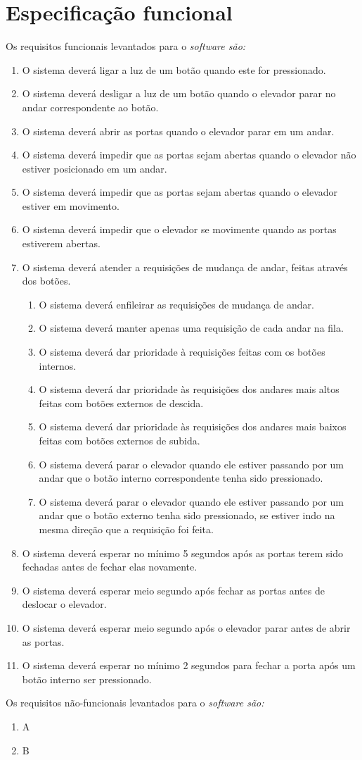 
\section{Especificação funcional}

Os requisitos funcionais levantados para o \it{software} são:

\begin{enumerate}[label=RF \arabic* -- , ref=\arabic*]
	\item O sistema deverá ligar a luz de um botão quando este for pressionado.
  \item O sistema deverá desligar a luz de um botão quando o elevador parar no andar correspondente ao botão.
  \item O sistema deverá abrir as portas quando o elevador parar em um andar.
  \item O sistema deverá impedir que as portas sejam abertas quando o elevador não estiver posicionado em um andar.
  \item O sistema deverá impedir que as portas sejam abertas quando o elevador estiver em movimento.
  \item O sistema deverá impedir que o elevador se movimente quando as portas estiverem abertas.
  \item O sistema deverá atender a requisições de mudança de andar, feitas através dos botões.
  \begin{enumerate}[label*=\arabic*]
    \item O sistema deverá enfileirar as requisições de mudança de andar.
    \item O sistema deverá manter apenas uma requisição de cada andar na fila.
    \item O sistema deverá dar prioridade à requisições feitas com os botões internos.
    \item O sistema deverá dar prioridade às requisições dos andares mais altos feitas com botões externos de descida.
    \item O sistema deverá dar prioridade às requisições dos andares mais baixos feitas com botões externos de subida.
    \item O sistema deverá parar o elevador quando ele estiver passando por um andar que o botão interno correspondente tenha sido pressionado.
    \item O sistema deverá parar o elevador quando ele estiver passando por um andar que o botão externo tenha sido pressionado, se estiver indo na mesma direção que a requisição foi feita.
    \end{enumerate}
  \item O sistema deverá esperar no mínimo 5 segundos após as portas terem sido fechadas antes de fechar elas novamente.
  \item O sistema deverá esperar meio segundo após fechar as portas antes de deslocar o elevador.
  \item O sistema deverá esperar meio segundo após o elevador parar antes de abrir as portas.
  \item O sistema deverá esperar no mínimo 2 segundos para fechar a porta após um botão interno ser pressionado.
\end{enumerate}

Os requisitos não-funcionais levantados para o \it{software} são:

\begin{enumerate}[label=RNF \arabic* -- , ref=\arabic*]
	\item A
	\item B
\end{enumerate}
